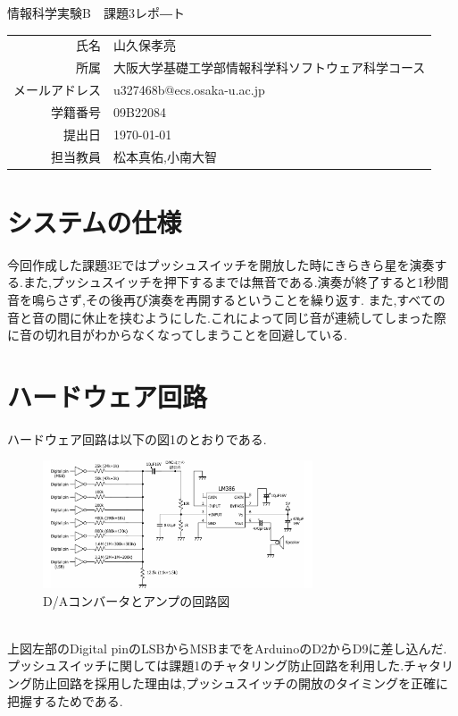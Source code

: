 \documentclass[dvipdfmx]{jarticle}
\begin{document}
\begin{titlepage}
    \begin{center}
        {\huge 情報科学実験B　課題3レポ―ト}
        \vspace{180pt}\\
        \begin{tabular}{rl}
            氏名 & 山久保孝亮\\
            所属 & 大阪大学基礎工学部情報科学科ソフトウェア科学コース\\
            メールアドレス & u327468b@ecs.osaka-u.ac.jp\\
            学籍番号 & 09B22084\\
            提出日 & \today\\
            担当教員 & 松本真佑,小南大智
        \end{tabular}
    \end{center}
\end{titlepage}
\section{システムの仕様}
今回作成した課題3Eではプッシュスイッチを開放した時にきらきら星を演奏する.また,プッシュスイッチを押下するまでは無音である.演奏が終了すると1秒間音を鳴らさず,その後再び演奏を再開するということを繰り返す.
また,すべての音と音の間に休止を挟むようにした.これによって同じ音が連続してしまった際に音の切れ目がわからなくなってしまうことを回避している.
\section{ハードウェア回路}
ハードウェア回路は以下の図1のとおりである.
\begin{figure}[h]
    \centering
    \includegraphics[width=8cm]{kairo.png}
    \caption{D/Aコンバータとアンプの回路図}
\end{figure}
\\上図左部のDigital pinのLSBからMSBまでをArduinoのD2からD9に差し込んだ.
プッシュスイッチに関しては課題1のチャタリング防止回路を利用した.\cite{0}チャタリング防止回路を採用した理由は,プッシュスイッチの開放のタイミングを正確に把握するためである.
\end{document}
